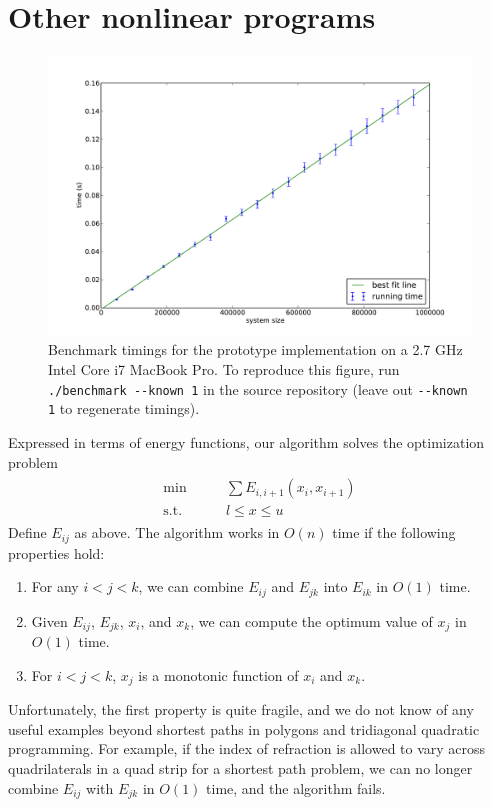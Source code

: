 \documentclass[11pt]{article}
\begin{document}
\section{Other nonlinear programs}

\begin{figure}[t]
\begin{center}
\includegraphics[width=.7\columnwidth]{benchmark.pdf}
\end{center}
\vspace{-.2in}
\cprotect\caption{Benchmark timings for the prototype implementation on a 2.7 GHz Intel Core i7 MacBook Pro.  To reproduce this figure, run \verb+./benchmark --known 1+ in the source repository
(leave out \verb+--known 1+ to regenerate timings).}
\label{benchmark}
\end{figure}

Expressed in terms of energy functions, our algorithm solves the optimization problem
\begin{align*}
\begin{array}{cc}
\min          \qquad& \sum E_{i,i+1}(x_i,x_{i+1}) \\
\textrm{s.t.} & l \le x \le u
\end{array}
\end{align*}
Define $E_{ij}$ as above.  The algorithm works in $O(n)$ time if the following properties hold:
\begin{enumerate}
\item For any $i < j < k$, we can combine $E_{ij}$ and $E_{jk}$ into $E_{ik}$ in $O(1)$ time.
\item Given $E_{ij}$, $E_{jk}$, $x_i$, and $x_k$, we can compute the optimum value of $x_j$ in $O(1)$ time.
\item For $i < j < k$, $x_j$ is a monotonic function of $x_i$ and $x_k$.
\end{enumerate}
Unfortunately, the first property is quite fragile, and we do not know of any useful examples beyond shortest paths in polygons and tridiagonal quadratic programming.  For example, if the index of
refraction is allowed to vary across quadrilaterals in a quad strip for a shortest path problem, we can no longer combine $E_{ij}$ with $E_{jk}$ in $O(1)$ time, and the algorithm fails.
\end{document}
